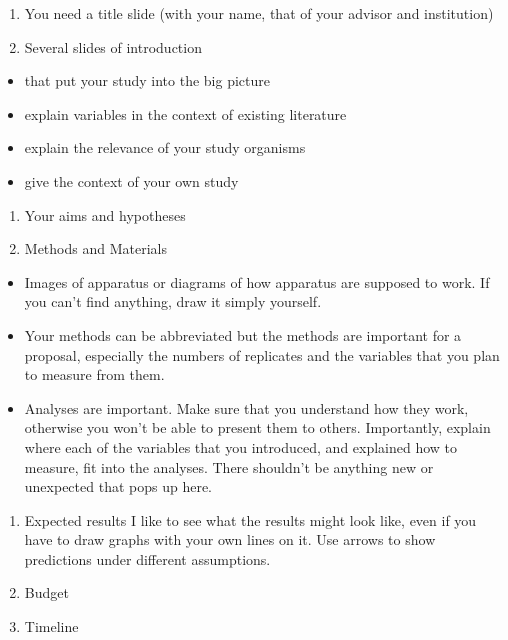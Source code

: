 \documentclass[
]{krantz}
\providecommand{\tightlist}{%
  \setlength{\itemsep}{0pt}\setlength{\parskip}{0pt}}
\begin{document}
\begin{enumerate}
\def\labelenumi{\arabic{enumi}.}
\tightlist
\item
  You need a title slide (with your name, that of your advisor and institution)
\item
  Several slides of introduction
\end{enumerate}

\begin{itemize}
\tightlist
\item
  that put your study into the big picture
\item
  explain variables in the context of existing literature
\item
  explain the relevance of your study organisms
\item
  give the context of your own study
\end{itemize}

\begin{enumerate}
\def\labelenumi{\arabic{enumi}.}
\tightlist
\item
  Your aims and hypotheses
\item
  Methods and Materials
\end{enumerate}

\begin{itemize}
\tightlist
\item
  Images of apparatus or diagrams of how apparatus are supposed to work. If you can't find anything, draw it simply yourself.
\item
  Your methods can be abbreviated but the methods are important for a proposal, especially the numbers of replicates and the variables that you plan to measure from them.
\item
  Analyses are important. Make sure that you understand how they work, otherwise you won't be able to present them to others. Importantly, explain where each of the variables that you introduced, and explained how to measure, fit into the analyses. There shouldn't be anything new or unexpected that pops up here.
\end{itemize}

\begin{enumerate}
\def\labelenumi{\arabic{enumi}.}
\tightlist
\item
  Expected results
  I like to see what the results might look like, even if you have to draw graphs with your own lines on it. Use arrows to show predictions under different assumptions.
\item
  Budget
\item
  Timeline
\end{enumerate}
\end{document}
